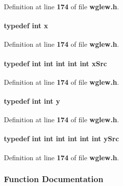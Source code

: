 Definition at line {\bf 174} of file {\bf wglew.\+h}.

\paragraph[{x}]{\setlength{\rightskip}{0pt plus 5cm}typedef {\bf int} {\bf x}}\label{wglew_8h_ad77deca22f617d3f0e0eb786445689fc}


Definition at line {\bf 174} of file {\bf wglew.\+h}.

\paragraph[{x\+Src}]{\setlength{\rightskip}{0pt plus 5cm}typedef {\bf int} {\bf int} {\bf int} {\bf int} {\bf int} {\bf x\+Src}}\label{wglew_8h_a1e74c8a3cae0daace05913929453de8f}


Definition at line {\bf 174} of file {\bf wglew.\+h}.

\paragraph[{y}]{\setlength{\rightskip}{0pt plus 5cm}typedef {\bf int} {\bf int} {\bf y}}\label{wglew_8h_a9298c7ad619074f5285b32c6b72bfdea}


Definition at line {\bf 174} of file {\bf wglew.\+h}.

\paragraph[{y\+Src}]{\setlength{\rightskip}{0pt plus 5cm}typedef {\bf int} {\bf int} {\bf int} {\bf int} {\bf int} {\bf int} {\bf y\+Src}}\label{wglew_8h_af9af3d7bdd9195fcb4a59cc008285a8e}


Definition at line {\bf 174} of file {\bf wglew.\+h}.



\subsubsection{Function Documentation}
